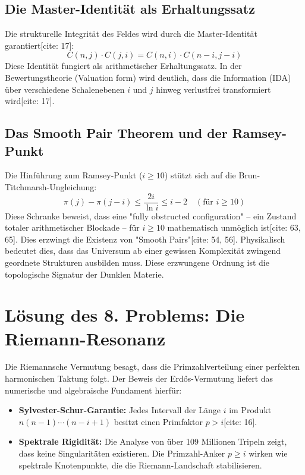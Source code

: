 \documentclass[12pt,a4paper]{article}
\begin{document}
	\subsection{Die Master-Identität als Erhaltungssatz}
	Die strukturelle Integrität des Feldes wird durch die Master-Identität garantiert[cite: 17]:
	\begin{equation}
		C(n,j) \cdot C(j,i) = C(n,i) \cdot C(n-i, j-i)
	\end{equation}
	Diese Identität fungiert als arithmetischer Erhaltungssatz. In der Bewertungstheorie (Valuation form) wird deutlich, dass die Information (IDA) über verschiedene Schalenebenen $i$ und $j$ hinweg verlustfrei transformiert wird[cite: 17].
	
	\subsection{Das Smooth Pair Theorem und der Ramsey-Punkt}
	Die Hinführung zum Ramsey-Punkt ($i \ge 10$) stützt sich auf die Brun-Titchmarsh-Ungleichung:
	\begin{equation}
		\pi(j) - \pi(j-i) \le \frac{2i}{\ln i} \le i-2 \quad (\text{für } i \ge 10)
	\end{equation}
	Diese Schranke beweist, dass eine "fully obstructed configuration" – ein Zustand totaler arithmetischer Blockade – für $i \ge 10$ mathematisch unmöglich ist[cite: 63, 65]. Dies erzwingt die Existenz von "Smooth Pairs"[cite: 54, 56]. Physikalisch bedeutet dies, dass das Universum ab einer gewissen Komplexität zwingend geordnete Strukturen ausbilden muss. Diese erzwungene Ordnung ist die topologische Signatur der Dunklen Materie.
	
	\section{Lösung des 8. Problems: Die Riemann-Resonanz}
	Die Riemannsche Vermutung besagt, dass die Primzahlverteilung einer perfekten harmonischen Taktung folgt. Der Beweis der Erdős-Vermutung liefert das numerische und algebraische Fundament hierfür:
	\begin{itemize}
		\item \textbf{Sylvester-Schur-Garantie:} Jedes Intervall der Länge $i$ im Produkt $n(n-1)\cdots(n-i+1)$ besitzt einen Primfaktor $p > i$[cite: 16].
		\item \textbf{Spektrale Rigidität:} Die Analyse von über 109 Millionen Tripeln zeigt, dass keine Singularitäten existieren. Die Primzahl-Anker $p \ge i$ wirken wie spektrale Knotenpunkte, die die Riemann-Landschaft stabilisieren.
	\end{itemize}
	
\end{document}
